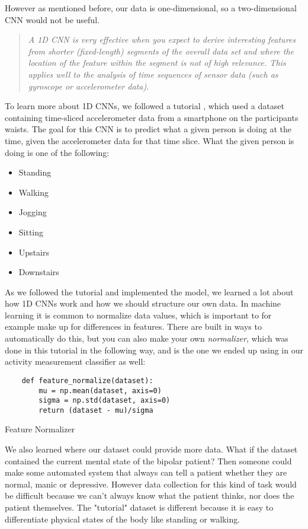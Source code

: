 However as mentioned before, our data is one-dimensional, so a two-dimensional CNN would not be useful.

\begin{quote}
  \textit{A 1D CNN is very effective when you expect to derive interesting features from shorter (fixed-length) segments of the overall data set 
  and where the location of the feature within the segment is not of high relevance. This applies well to the analysis of time sequences of sensor data 
  (such as gyroscope or accelerometer data).} \cite{1d_cnn}
\end{quote}

To learn more about 1D CNNs, we followed a tutorial \cite{1d_cnn}, which used a dataset containing 
time-sliced accelerometer data from a smartphone on the participants waists. The goal for this CNN is to predict what a given person is doing 
at the time, given the accelerometer data for that time slice. What the given person is doing is one of the following:
\begin{itemize}
  \item Standing
  \item Walking
  \item Jogging
  \item Sitting
  \item Upstairs
  \item Downstairs
\end{itemize}

As we followed the tutorial and implemented the model, we learned a lot about how 1D CNNs work and how we should structure our own data. 
In machine learning it is common to normalize data values, which is important to for example make up for differences in features. 
There are built in ways to automatically do this, but you can also make your own \textit{normalizer}, which was done in this tutorial in the following way, 
and is the one we ended up using in our activity measurement classifier as well:

\begin{code} 
  \begin{verbatim}
    def feature_normalize(dataset):
        mu = np.mean(dataset, axis=0)
        sigma = np.std(dataset, axis=0)
        return (dataset - mu)/sigma
  \end{verbatim}
  \caption{Feature Normalizer}
  \label{code:feature_normalizer}
\end{code}

We also learned where our dataset could provide more data. 
What if the dataset contained the current mental state of the bipolar patient? Then someone could make some automated system that always can tell a patient 
whether they are normal, manic or depressive. However data collection for this kind of task would be difficult because we can't always know what the
patient thinks, nor does the patient themselves. The "tutorial" dataset is different because it is easy to differentiate physical states of the body
like standing or walking.

